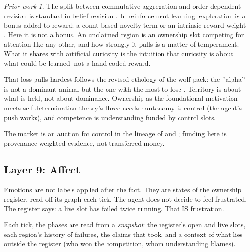 \documentclass[11pt]{article}
\theoremstyle{remark}
\newtheorem*{prior}{Prior work}
\begin{document}
\begin{prior}
The split between commutative aggregation and order-dependent revision is standard in
belief revision \citep{AlchourronGardenforsMakinson1985,DarwichePearl1997}. In reinforcement
learning, exploration is a bonus added to reward: a count-based novelty term
\citep{StrehlLittman2008,Bellemare2016} or an intrinsic-reward weight
\citep{Pathak2017,OudeyerKaplanHafner2007}. Here it is not a bonus. An unclaimed region is
an ownership slot competing for attention like any other, and how strongly it pulls is a
matter of temperament. What it shares with artificial curiosity
\citep{Schmidhuber1991,OudeyerKaplanHafner2007} is the intuition that curiosity is about what
could be learned, not a hand-coded reward.

That loss pulls hardest follows the revised ethology of the wolf pack: the ``alpha'' is not a
dominant animal but the one with the most to lose \citep{Mech1999}. Territory is about what
is held, not about dominance. Ownership as the foundational motivation meets
self-determination theory's three needs \citep{DeciRyan1985,RyanDeci2000}: autonomy is
control (the agent's push works), and competence is understanding funded by control slots.

The market is an auction for control in the
lineage of \citet{Baum1999} and \citet{Wellman1993}; funding here is provenance-weighted
evidence, not transferred money.
\end{prior}

\subsection{Layer 9: Affect}
\label{sec:affect}

Emotions are not labels applied after the fact. They are states of the ownership register,
read off its graph each tick. The agent does not decide to feel frustrated. The register
says: a live slot has failed twice running. That IS frustration.

Each tick, the phases are read from a \emph{snapshot}: the register's open and live slots,
each region's history of failures, the claims that took, and a context of what lies outside
the register (who won the competition, whom understanding blames).
\end{document}
